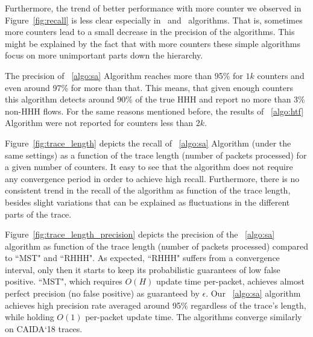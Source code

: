 Furthermore, the trend of better performance with more counter we observed in Figure~\ref{fig:recall} is less clear especially in ~\simpleAlgo and ~\multipleAlgo algorithms. That is, sometimes more counters lead to a small decrease in the precision of the algorithms. This might be explained by the fact that with more counters these simple algorithms focus on more unimportant  parts down the hierarchy.

The precision of ~\ref{algo:sa} Algorithm reaches more than 95\% for $1k$ counters and even around 97\% for more than that. This means, that given enough counters this algorithm  detects around 90\% of the true HHH and report no more than 3\% non-HHH flows. For the same reasons mentioned before, the results of ~\ref{algo:htf} Algorithm were not reported for counters less than $2k$.



Figure~\ref{fig:trace_length} depicts the recall of ~\ref{algo:sa} Algorithm (under the same settings) as a function of the trace length (number of packets processed) for a given number of counters. It easy to see that the algorithm does not require any convergence period in order to achieve high recall. Furthermore, there is no consistent trend in the recall of the algorithm as function of the trace length, besides slight variations that can be explained as fluctuations in the different parts of the trace.



Figure~\ref{fig:trace_length_precision} depicts the precision of the ~\ref{algo:sa} algorithm as function of the trace length (number of packets processed) compared to ``MST" and ``RHHH". As expected, ``RHHH" suffers from a convergence interval, only then it starts to keep its probabilistic guarantees of low false positive. ``MST", which requires $O(H)$ update time per-packet, achieves almost perfect precision (no false positive) as guaranteed by $\epsilon$. Our ~\ref{algo:sa} algorithm achieves high precision rate averaged around 95\% regardless of the trace's length, while holding $O(1)$ per-packet update time. The algorithms converge similarly on CAIDA`18 traces.
